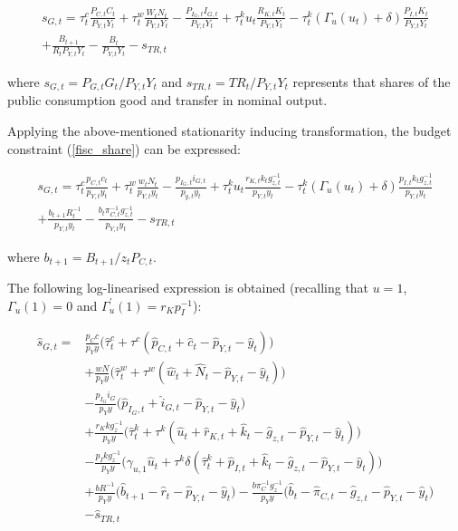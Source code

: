 \documentclass[a4paper,11pt]{article}
\numberwithin{equation}{section}
\begin{document}
	\begin{multline} \label{fisc_share}
	s_{G,t}=\tau_t^c\frac{P_{C,t}C_t}{P_{Y,t}Y_t}+\tau_t^w\frac{W_{t}N_t}{P_{Y,t}Y_t}-\frac{P_{I_G,t}I_{G,t}}{P_{Y,t}Y_t}+\tau_t^ku_t\frac{R_{K,t}K_t}{P_{Y,t}Y_t}-\tau_t^k\left(\Gamma_u(u_t)+\delta\right)\frac{P_{I,t}K_t}{P_{Y,t}Y_t}\\
	+\frac{B_{t+1}}{R_tP_{Y,t}Y_t}-\frac{B_t}{P_{Y,t}Y_t} -s_{TR,t}
	\end{multline}
	
	where $s_{G,t}=P_{G,t}G_t/P_{Y,t}Y_t$ and $s_{TR,t}=TR_t/P_{Y,t}Y_t$ represents that shares of the public consumption good and transfer in nominal output.
	
	Applying the above-mentioned stationarity inducing transformation, the budget constraint (\ref{fisc_share}) can be expressed:
	
	\begin{multline}
	s_{G,t}=\tau_t^c\frac{p_{C,t}c_t}{p_{Y,t}y_t}+\tau_t^w\frac{w_{t}N_t}{p_{Y,t}y_t}-\frac{p_{I_G,t}i_{G,t}}{p_{y,t}y_t}+\tau_t^ku_t\frac{r_{K,t}k_tg_{z,t}^{-1}}{p_{Y,t}y_t}-\tau_t^k\left(\Gamma_u(u_t)+\delta\right)\frac{p_{I,t}k_tg_{z,t}^{-1}}{p_{Y,t}y_t}\\
	+\frac{b_{t+1}R_t^{-1}}{p_{Y,t}y_t}-\frac{b_t\pi_{C,t}^{-1}g_{z,t}^{-1}}{p_{Y,t}y_t}-s_{TR,t}
	\end{multline}
	
	where $b_{t+1}=B_{t+1}/z_tP_{C,t}$.
	
	The following log-linearised expression is obtained (recalling that $u=1$, $\Gamma_u(1)=0$ and $\Gamma_u^{'}(1)=r_Kp_I^{-1}$):
	
	\begin{align}
	\hat{s}_{G,t}=&\frac{p_C c}{p_Y y}\Big(\hat{\tau}_t^c+\tau^c\left(\hat{p}_{C,t}+\hat{c}_t-\hat{p}_{Y,t}-\hat{y}_t\right)\Big)\\
	&+\frac{wN}{p_Y y}\Big(\hat{\tau}_t^w+\tau^w\left(\hat{w}_{t}+\hat{N}_t-\hat{p}_{Y,t}-\hat{y}_t\right)\Big)\nonumber\\
	&-\frac{p_{I_G} i_G}{p_Y y}\Big(\hat{p}_{I_G,t}+\hat{i}_{G,t}-\hat{p}_{Y,t}-\hat{y}_t\Big)\nonumber\\
	&+\frac{r_Kkg_z^{-1}}{p_Y y}\Big(\hat{\tau}_t^k+\tau^k\left(\hat{u}_t+\hat{r}_{K,t}+\hat{k}_t-\hat{g}_{z,t}-\hat{p}_{Y,t}-\hat{y}_t\right)\Big)\nonumber\\
	&-\frac{p_Ikg_z^{-1}}{p_Y y}\Big(\gamma_{u,1}\hat{u}_t+\tau^k\delta\left(\hat{\tau}_t^k+\hat{p}_{I,t}+\hat{k}_t-\hat{g}_{z,t}-\hat{p}_{Y,t}-\hat{y}_t\right)\Big)\nonumber\\
	&+\frac{bR^{-1}}{p_Yy}\Big(\hat{b}_{t+1}-\hat{r}_t-\hat{p}_{Y,t}-\hat{y}_t\Big)-\frac{b\pi_C^{-1}g_z^{-1}}{p_Yy}\Big(\hat{b}_t-\hat{\pi}_{C,t}-\hat{g}_{z,t}-\hat{p}_{Y,t}-\hat{y}_t\Big)\nonumber\\
	&-\hat{s}_{TR,t}\nonumber
	\end{align} 
	
\end{document}
